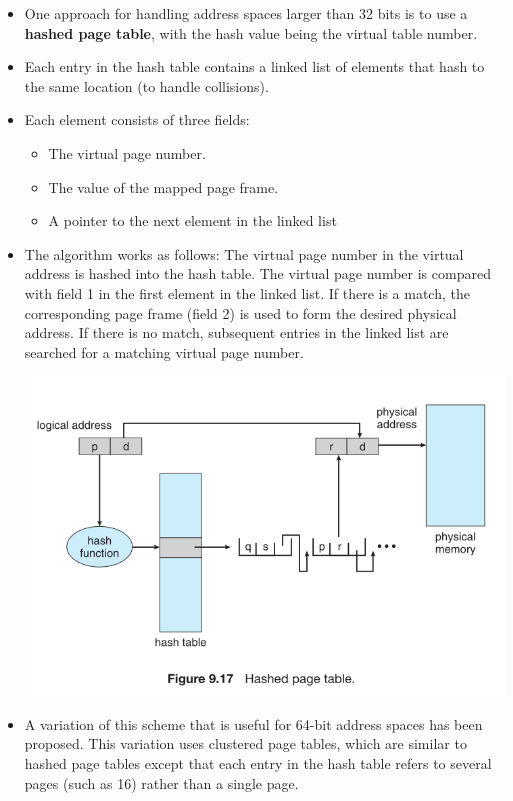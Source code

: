 \documentclass[10pt]{article}
\newcommand{\tf}{\textbf}
\begin{document}
\begin{itemize}
	\item One approach for handling address spaces larger than 32 bits is to use a \tf{hashed page table}, with the hash value being the virtual table number. 
	\item Each entry in the hash table contains a linked list of elements that hash to the same location (to handle collisions).
	\item Each element consists of three fields:
	\begin{itemize}
		\item The virtual page number.
		\item The value of the mapped page frame.
		\item A pointer to the next element in the linked list
	\end{itemize}

	\item The algorithm works as follows: The virtual page number in the virtual address is hashed into the hash table. The virtual page number is compared with field 1 in the first element in the linked list. If there is a match, the corresponding page frame (field 2) is used to form the desired physical address. If there is no match, subsequent entries in the linked list are searched for a matching virtual page number.
	
	\bigbreak
	\includegraphics[scale = 0.7]{HashedPageTable.png}
	\bigbreak

	\item A variation of this scheme that is useful for 64-bit address spaces has been proposed. This variation uses clustered page tables, which are similar to hashed page tables except that each entry in the hash table refers to several pages (such as 16) rather than a single page.
\end{itemize}
\end{document}
